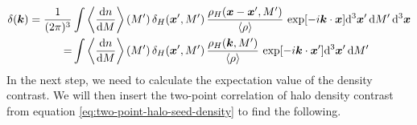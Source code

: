 \documentclass[../main.tex]{subfiles}
\begin{document}
\begin{align}
    \delta(\boldsymbol{k}) = \frac{1}{(2\pi)^3}&\int \left\langle  \frac{\mathrm{d} n}{\mathrm{d} M} \right\rangle(M')\,\delta_H(\boldsymbol{x}',M') \,\frac{\rho_H(\boldsymbol{x}-\boldsymbol{x}',M')}{\langle \rho \rangle}\,\exp[{-i\boldsymbol{k}\cdot\boldsymbol{x}}] \mathrm{d}^3 \boldsymbol{x}' \,\mathrm{d} M'\,\mathrm{d}^3\boldsymbol{x}\\
    =&\int \left\langle  \frac{\mathrm{d} n}{\mathrm{d} M} \right\rangle(M')\,\delta_H(\boldsymbol{x}',M') \,\frac{\rho_H(\boldsymbol{k},M')}{\langle \rho \rangle}\,\exp[{-i\boldsymbol{k}\cdot\boldsymbol{x}'}] \mathrm{d}^3 \boldsymbol{x}' \,\mathrm{d} M'
\end{align} 
In the next step, we need to calculate the expectation value of the density contrast. We will then insert the two-point correlation of halo density contrast from equation \ref{eq:two-point-halo-seed-density} to find the following.
\end{document}
